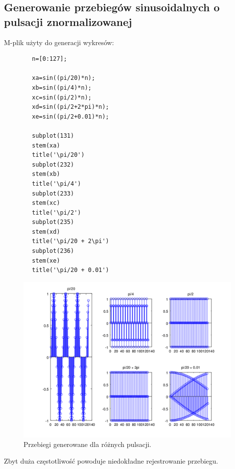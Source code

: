 \documentclass[12pt,titlepage]{report}
\begin{document}
\subsection{Generowanie przebiegów sinusoidalnych o pulsacji znormalizowanej}
M-plik użyty do generacji wykresów:
\begin{multicols}{2}
	{
		\tiny
		\begin{verbatim}
		n=[0:127];
		
		xa=sin((pi/20)*n);
		xb=sin((pi/4)*n);
		xc=sin((pi/2)*n);
		xd=sin((pi/2+2*pi)*n);
		xe=sin((pi/2+0.01)*n);
		
		subplot(131)
		stem(xa)
		title('\pi/20')
		subplot(232)
		stem(xb)
		title('\pi/4')
		subplot(233)
		stem(xc)
		title('\pi/2')
		subplot(235)
		stem(xd)
		title('\pi/20 + 2\pi')
		subplot(236)
		stem(xe)
		title('\pi/20 + 0.01')
		\end{verbatim}
	}
\end{multicols}
\begin{figure}[!h]
	\centering
	\includegraphics[scale=0.7]{../cw11_output}
	\caption{Przebiegi generowane dla różnych pulsacji.}
\end{figure}
Zbyt duża częstotliwość powoduje niedokładne rejestrowanie przebiegu.
\newpage
\end{document}
